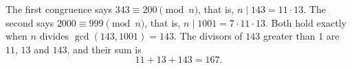 The first congruence says $343\equiv200\pmod n$, that is, $n\mid143=11\cdot13$. The second says $2000\equiv999\pmod n$, that is, $n\mid1001=7\cdot11\cdot13$. Both hold exactly when $n$ divides $\gcd(143,1001)=143$. The divisors of $143$ greater than $1$ are $11$, $13$ and $143$, and their sum is
\[11+13+143=\boxed{167}.\]
